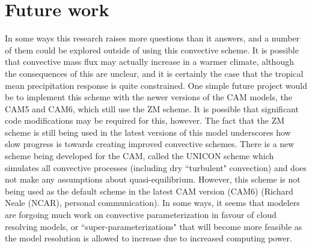 \documentclass[letterpaper,12pt,titlepage,oneside,final]{book}
\begin{document}
\section{Future work}
In some ways this research raises more questions than it answers, and a number of them could be explored outside of using this convective scheme. It is possible that convective mass flux may actually increase in a warmer climate, although the consequences of this are unclear, and it is certainly the case that the tropical mean precipitation response is quite constrained. One simple future project would be to implement this scheme with the newer versions of the CAM models, the CAM5 and CAM6, which still use the ZM scheme. It is possible that significant code modifications may be required for this, however. The fact that the ZM scheme is still being used in the latest versions of this model underscores how slow progress is towards creating improved convective schemes. There is a new scheme being developed for the CAM, called the UNICON scheme \citep{park_unified_2014,park_unified_2014-1} which simulates all convective processes (including dry ``turbulent" convection) and does not make any assumptions about quasi-equilibrium. However, this scheme is not being used as the default scheme in the latest CAM version (CAM6) (Richard Neale (NCAR), personal communication). In some ways, it seems that modelers are forgoing much work on convective parameterization in favour of cloud resolving models, or ``super-parameterizations" \citep{li_super-parameterization:_2012} that will become more feasible as the model resolution is allowed to increase due to increased computing power.
\end{document}
